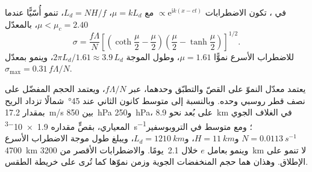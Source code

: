 \begin{theorem}\label{thm:b3:atmospheric-dynamics:eady}
في ، تكون الاضطرابات $\propto \mathrm e^{\mathrm ik(x - ct)}$
مع $\mu = kL_d$، $L_d = NH/f$، تنمو أُسّيًّا عندما $\mu < \mu_c =
2.40$، بالمعدّل
\[
\sigma = \frac{f\Lambda}{N}\left[\left(\coth\frac{\mu}{2} - \frac{\mu}{2}\right)\left(\frac{\mu}{2} - \tanh\frac{\mu}{2}\right)\right]^{1/2} .
\]
للاضطراب الأسرع نموًّا $\mu = 1.61$، وطول الموجة $2\pi L_d/1.61
\approx 3.9\,L_d$، وينمو بمعدّل $\sigma_{\max} = 0.31\,f\Lambda/N$.
\end{theorem}
\admitted

يعتمد معدّل النموّ على القصّ والتطبّق وحدهما، عبر
$f\Lambda/N$، ويعتمد الحجم المفضّل على نصف قطر روسبي وحده. وبالنسبة إلى متوسط كانون الثاني
عند \ang{45}~شمالًا تزداد الريح بمقدار \qty{17.2}{m/s} بين
\qty{850}{hPa} و\qty{250}{hPa}، على بُعد نحو \qty{8.9}{km} في الغلاف الجوي المعياري،
بقصٍّ مقداره \qty{1.9e-3}{s^{-1}}؛ ومع متوسط
 في التروبوسفير $N = \qty{0.0113}{s^{-1}}$ و$H = \qty{11}{km}$، و$L_d =
\qty{1210}{km}$، ويبلغ طول موجة الاضطراب الأسرع \qty{4700}{km}
وينمو بعامل $e$ خلال \num{2.1}~يومًا. والاضطرابات الأقصر من
\qty{3200}{km} لا تنمو على الإطلاق. وهذان هما حجم المنخفضات الجوية وزمن نموّها
كما تُرى على خريطة الطقس.

